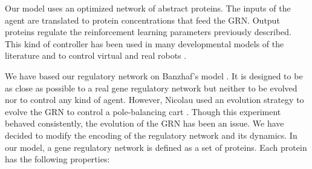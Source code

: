 \documentclass[conference]{IEEEtran}
\begin{document}


Our model uses an optimized network of abstract proteins. The inputs of the
agent are translated to protein concentrations that feed the GRN. Output
proteins regulate the reinforcement learning parameters previously described.
This kind of controller has been used in many developmental models of the
literature \cite{Joachimczak08, Doursat09, CussatBlanc2012a} and to control
virtual and real robots \cite{Ziegler:2001:AL, Nicolau:2010:EuroGP,
Joachimczak10, CussatBlanc2012b}.

We have based our regulatory network on Banzhaf's model
\cite{banzhaf:2003:GPTP}. It is designed to be as close as possible to a real
gene regulatory network but neither to be evolved nor to control any kind of
agent. However, Nicolau used an evolution strategy to evolve the GRN to control
a pole-balancing cart \cite{Nicolau:2010:EuroGP}. Though this experiment behaved
consistently, the evolution of the GRN has been an issue. We have decided to
modify the encoding of the regulatory network and its dynamics. In our model, a
gene regulatory network is defined as a set of proteins. Each protein has the
following properties:
\end{document}
